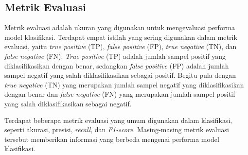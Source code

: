 \subsection{Metrik Evaluasi}
\label{subsec: landasan-metrik-evaluasi}
Metrik evaluasi adalah ukuran yang digunakan untuk mengevaluasi performa model klasifikasi.
Terdapat empat istilah yang sering digunakan dalam metrik evaluasi, yaitu \textit{true positive} (TP), \textit{false positive} (FP), \textit{true negative} (TN), dan \textit{false negative} (FN).
\textit{True positive} (TP) adalah jumlah sampel positif yang diklasifikasikan dengan benar, sedangkan \textit{false positive} (FP) adalah jumlah sampel negatif yang salah diklasifikasikan sebagai positif.
Begitu pula dengan \textit{true negative} (TN) yang merupakan jumlah sampel negatif yang diklasifikasikan dengan benar dan \textit{false negative} (FN) yang merupakan jumlah sampel positif yang salah diklasifikasikan sebagai negatif.

Terdapat beberapa metrik evaluasi yang umum digunakan dalam klasifikasi, seperti akurasi, presisi, \textit{recall}, dan \textit{F1-score}.
Masing-masing metrik evaluasi tersebut memberikan informasi yang berbeda mengenai performa model klasifikasi.
